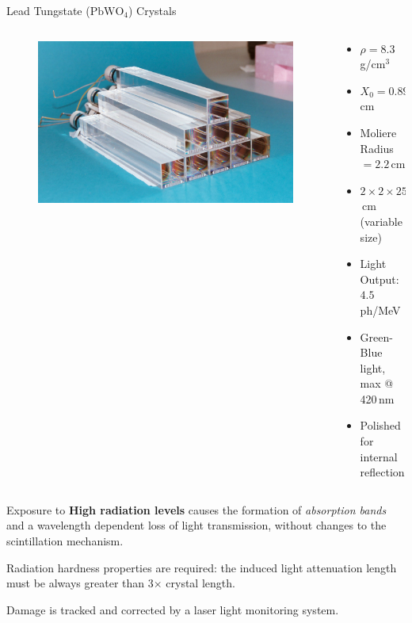\documentclass[10pt]{beamer}
\begin{document}
\begin{frame}{Lead Tungstate ($\text{PbWO}_4$) Crystals}
    \begin{columns}
        \begin{column}[l]{0.45\textwidth}
            \begin{figure}
                \includegraphics[width=\textwidth]{./img/crystals.jpg}
            \end{figure}    
        \end{column}
        \begin{column}[l]{0.55\textwidth}
            \begin{itemize}
                \item $\rho = 8.3\,$g/cm$^3$
                \item $X_0 = 0.89\,$cm
                \item Moliere Radius $ = 2.2$\,cm
                \item $2\times2\times25$\,cm (variable size) 
                \item Light Output: $4.5$ ph/MeV
                \item Green-Blue light, max @ 420\,nm
                \item Polished for internal reflection
            \end{itemize}
        \end{column}
    \end{columns}
    \bigskip
    Exposure to \textbf{High radiation levels} causes the formation of \emph{absorption bands} and a wavelength dependent loss of light transmission, without changes to the scintillation mechanism.
    
    Radiation hardness properties are required: the induced light attenuation length must be always greater than 3$\times$ crystal length. 
    
    Damage is tracked and corrected by a laser light monitoring system.
\end{frame}
\end{document}
